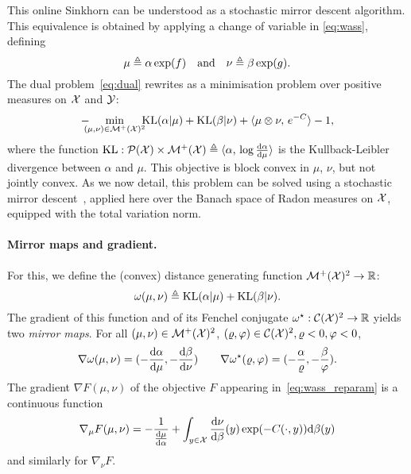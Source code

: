 This online Sinkhorn can be understood as a stochastic mirror descent algorithm.
%
This equivalence is obtained by applying a change
of variable in \eqref{eq:wass}, defining 
\begin{equation}\label{eq-change-var}
	\mu \triangleq \alpha \exp(f)
	\quad \text{and} \quad 
	\nu \triangleq \beta \exp(g). 
\end{equation}
The dual problem~\eqref{eq:dual} 
rewrites as a minimisation problem over positive measures on $\mathcal{X}$ and $\mathcal{Y}$:
\begin{equation}\label{eq:wass_reparam}
    - \!\!\!\!\min_{(\mu,\nu) \in \mathcal{M}^+(\mathcal{X})^2} \!\!\!\textrm{KL}(\alpha | \mu)
    + \textrm{KL}(\beta | \nu) + \langle \mu \otimes \nu,\,e^{-C}\rangle - 1,
\end{equation}
where the function $\textrm{KL}: \mathcal{P}(\mathcal{X}) \times \mathcal{M}^+(\mathcal{X}) \triangleq \langle \alpha,\, \log \frac{\textrm{d} \alpha}{\textrm{d} \mu}\rangle$ is the Kullback-Leibler divergence between
$\alpha$ and $\mu$. 
%
This objective is block convex in $\mu$, $\nu$, but not jointly convex. 
%
As we now detail, this problem can be solved using a stochastic mirror descent~\citep{beck2003mirror}, applied here over the Banach space of Radon measures on $\mathcal{X}$, equipped with the total variation norm. 

\paragraph{Mirror maps and gradient.}

For this, we define the (convex) distance generating function $\mathcal{M}^+(\mathcal{X})^2 \to \mathbb{R}$:
\begin{equation}
    \omega(\mu, \nu) \triangleq \textrm{KL}(\alpha | \mu) + \textrm{KL}(\beta | \nu).
\end{equation}
The gradient of this function and of its Fenchel conjugate $\omega^\star:
\mathcal{C}(\mathcal{X})^2 \to \mathbb{R}$ yields two \textit{mirror maps}. For all $(\mu, \nu) \in
\mathcal{M}^+(\mathcal{X})^2$, $(\varrho, \varphi) \in \mathcal{C}(\mathcal{X})^2, \varrho < 0, \varphi < 0$,
\begin{equation}
    \nabla \omega(\mu, \nu) = (- \frac{\textrm{d} \alpha}{\textrm{d} \mu}, - \frac{\textrm{d} \beta}{\textrm{d} \nu} )
    \qquad \nabla \omega^\star(\varrho, \varphi)
     = (-\frac{\alpha}{\varrho}, -\frac{\beta}{\varphi}).
\end{equation}
The gradient $\nabla F(\mu, \nu)$ of the objective $F$ appearing
in~\eqref{eq:wass_reparam} is a continuous function
\begin{equation}
    \nabla_\mu F(\mu, \nu) = - \frac{1}{\frac{\textrm{d}\mu}{\textrm{d}\alpha}} + \int_{y \in \mathcal{X}}
    \frac{\textrm{d} \nu}{\textrm{d} \beta}(y) \exp(- C(\cdot, y)) \textrm{d} \beta(y)
\end{equation}
and similarly for $\nabla_\nu F$.

